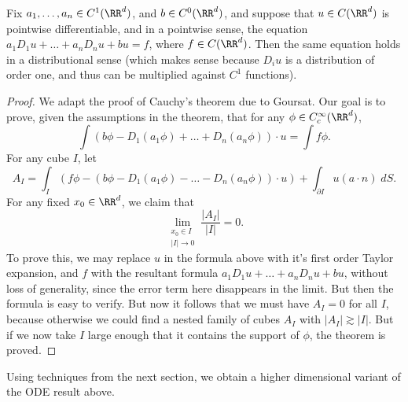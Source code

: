 \begin{theorem}
    Fix $a_1,\dots,a_n \in C^1(\RR^d)$, and $b \in C^0(\RR^d)$, and suppose that $u \in C(\RR^d)$ is pointwise differentiable, and in a pointwise sense, the equation $a_1 D_1 u + \dots + a_n D_n u + b u = f$, where $f \in C(\RR^d)$. Then the same equation holds in a distributional sense (which makes sense because $D_i u$ is a distribution of order one, and thus can be multiplied against $C^1$ functions).
\end{theorem}
\begin{proof}
    We adapt the proof of Cauchy's theorem due to Goursat. Our goal is to prove, given the assumptions in the theorem, that for any $\phi \in C_c^\infty(\RR^d)$,
    \[ \int (b \phi - D_1(a_1 \phi) + \dots + D_n(a_n \phi)) \cdot u = \int f \phi. \]
    For any cube $I$, let
    \[ A_I = \int_I (f \phi - (b \phi - D_1(a_1 \phi) - \dots - D_n(a_n \phi)) \cdot u) + \int_{\partial I} u (a \cdot n)\; dS. \]
    For any fixed $x_0 \in \RR^d$, we claim that
    \[ \lim_{\substack{x_0 \in I\\|I| \to 0}} \frac{|A_I|}{|I|} = 0. \]
    To prove this, we may replace $u$ in the formula above with it's first order Taylor expansion, and $f$ with the resultant formula $a_1 D_1 u + \dots + a_n D_n u + bu$, without loss of generality, since the error term here disappears in the limit. But then the formula is easy to verify. But now it follows that we must have $A_I = 0$ for all $I$, because otherwise we could find a nested family of cubes $A_I$ with $|A_I| \gtrsim |I|$. But if we now take $I$ large enough that it contains the support of $\phi$, the theorem is proved.
\end{proof}

Using techniques from the next section, we obtain a higher dimensional variant of the ODE result above.

